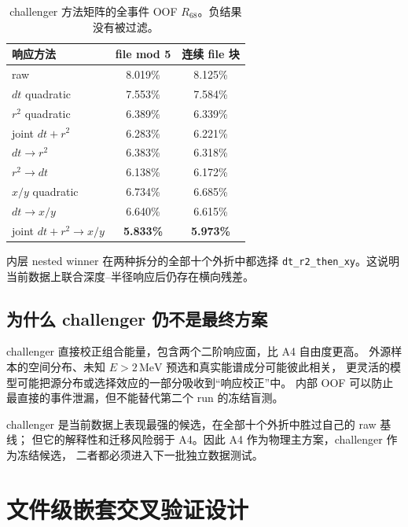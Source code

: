 \documentclass[UTF8,12pt,a4paper,oneside,fontset=none]{ctexart}
\numberwithin{equation}{section}
\newcommand{\Rsixtyeight}{R_{68}}
\begin{document}
\begin{table}[H]
\centering
\caption{challenger 方法矩阵的全事件 OOF \(\Rsixtyeight\)。负结果没有被过滤。}
\label{tab:challenger-matrix}
\begin{tabular}{lcc}
\toprule
响应方法 & file mod 5 & 连续 file 块 \\
\midrule
raw & 8.019\% & 8.125\% \\
\(dt\) quadratic & 7.553\% & 7.584\% \\
\(r^2\) quadratic & 6.389\% & 6.339\% \\
joint \(dt+r^2\) & 6.283\% & 6.221\% \\
\(dt\rightarrow r^2\) & 6.383\% & 6.318\% \\
\(r^2\rightarrow dt\) & 6.138\% & 6.172\% \\
\(x/y\) quadratic & 6.734\% & 6.685\% \\
\(dt\rightarrow x/y\) & 6.640\% & 6.615\% \\
\rowcolor{SoftGold}
joint \(dt+r^2\rightarrow x/y\) & \textbf{5.833\%} & \textbf{5.973\%} \\
\bottomrule
\end{tabular}
\end{table}

内层 nested winner 在两种拆分的全部十个外折中都选择
\texttt{dt\_r2\_then\_xy}。这说明当前数据上联合深度--半径响应后仍存在横向残差。

\subsection{为什么 challenger 仍不是最终方案}

challenger 直接校正组合能量，包含两个二阶响应面，比 A4 自由度更高。
外源样本的空间分布、未知 \(E>2\,\mathrm{MeV}\) 预选和真实能谱成分可能彼此相关，
更灵活的模型可能把源分布或选择效应的一部分吸收到“响应校正”中。
内部 OOF 可以防止最直接的事件泄漏，但不能替代第二个 run 的冻结盲测。

\begin{conclusionbox}
challenger 是当前数据上表现最强的候选，在全部十个外折中胜过自己的 raw 基线；
但它的解释性和迁移风险弱于 A4。因此 A4 作为物理主方案，challenger 作为冻结候选，
二者都必须进入下一批独立数据测试。
\end{conclusionbox}

\section{文件级嵌套交叉验证设计}
\end{document}
